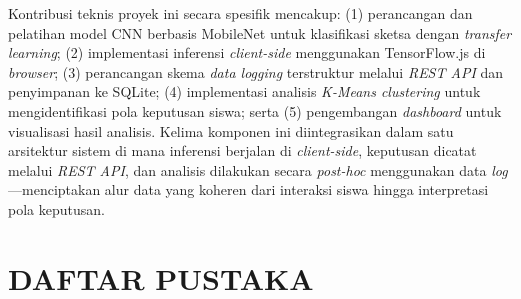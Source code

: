 \documentclass[12pt,a4paper,oneside,openany]{report}
\begin{document}
Kontribusi teknis proyek ini secara spesifik mencakup: (1) perancangan dan pelatihan model CNN berbasis MobileNet untuk klasifikasi sketsa dengan \textit{transfer learning}; (2) implementasi inferensi \textit{client-side} menggunakan TensorFlow.js di \textit{browser}; (3) perancangan skema \textit{data logging} terstruktur melalui \textit{REST API} dan penyimpanan ke SQLite; (4) implementasi analisis \textit{K-Means clustering} untuk mengidentifikasi pola keputusan siswa; serta (5) pengembangan \textit{dashboard} untuk visualisasi hasil analisis. Kelima komponen ini diintegrasikan dalam satu arsitektur sistem di mana inferensi berjalan di \textit{client-side}, keputusan dicatat melalui \textit{REST API}, dan analisis dilakukan secara \textit{post-hoc} menggunakan data \textit{log}---menciptakan alur data yang koheren dari interaksi siswa hingga interpretasi pola keputusan.

\chapter*{DAFTAR PUSTAKA}
\end{document}
